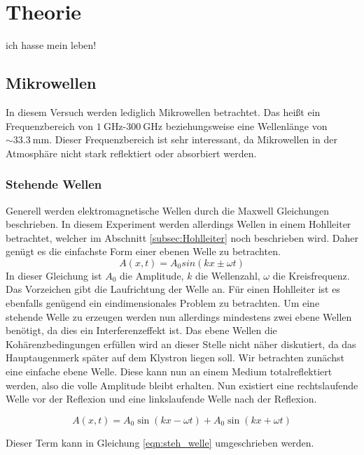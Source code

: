\chapter{Theorie}
\label{cha:Theorie}
ich hasse mein leben!
\section{Mikrowellen}
\label{sec:mikrowellen}
In diesem Versuch werden lediglich Mikrowellen betrachtet. Das heißt ein Frequenzbereich von $\qty{1}{\giga\hertz}$-$\qty{300}{\giga\hertz}$ beziehungsweise eine Wellenlänge von 
$\sim \qty{33.3}{\milli\metre}$. Dieser Frequenzbereich ist sehr interessant, da Mikrowellen in der Atmosphäre nicht stark reflektiert oder absorbiert werden.
\subsection{Stehende Wellen}
\label{subsec:stehende_Welle}
Generell werden elektromagnetische Wellen durch die Maxwell Gleichungen beschrieben. In diesem Experiment werden allerdings Wellen in einem Hohlleiter betrachtet, welcher im Abschnitt 
\ref{subsec:Hohlleiter} noch beschrieben wird. Daher genügt es die einfachste Form einer ebenen Welle zu betrachten.
\begin{equation*}
              A(x,t) = A_0sin(kx\pm\omega t)
\end{equation*}
In dieser Gleichung ist $A_0$ die Amplitude, $k$ die Wellenzahl, $\omega$ die Kreisfrequenz. Das Vorzeichen gibt die Laufrichtung der Welle an. Für einen Hohlleiter ist es ebenfalls 
genügend ein eindimensionales Problem zu betrachten. Um eine stehende Welle zu erzeugen werden nun allerdings mindestens zwei ebene Wellen benötigt, da dies ein Interferenzeffekt ist.
Das ebene Wellen die Kohärenzbedingungen erfüllen wird an dieser Stelle nicht näher diskutiert, da das Hauptaugenmerk später auf dem Klystron liegen soll. Wir betrachten zunächst eine
einfache ebene Welle. Diese kann nun an einem Medium totalreflektiert werden, also die volle Amplitude bleibt erhalten. Nun existiert eine rechtslaufende Welle vor der Reflexion und
eine linkslaufende Welle nach der Reflexion. 

\begin{equation*}
              A(x,t) = A_0\sin(kx - \omega t) + A_0\sin(kx + \omega t)
\end{equation*}

Dieser Term kann in Gleichung \ref{eqn:steh_welle} umgeschrieben werden.

